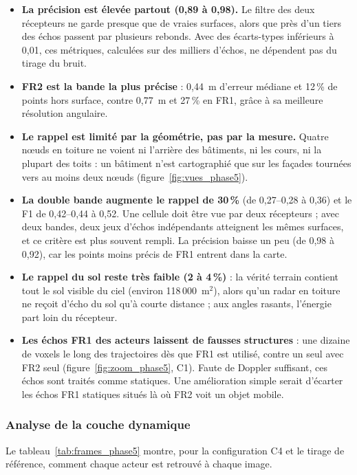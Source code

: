 \documentclass[12pt,a4paper,titlepage]{article}
\begin{document}
\begin{itemize}[leftmargin=1.5em]
    \item \textbf{La précision est élevée partout (0,89 à 0,98).} Le filtre des deux récepteurs ne garde presque que de vraies surfaces, alors que près d'un tiers des échos passent par plusieurs rebonds. Avec des écarts-types inférieurs à 0,01, ces métriques, calculées sur des milliers d'échos, ne dépendent pas du tirage du bruit.
    \item \textbf{FR2 est la bande la plus précise} : 0,44~m d'erreur médiane et 12\,\% de points hors surface, contre 0,77~m et 27\,\% en FR1, grâce à sa meilleure résolution angulaire.
    \item \textbf{Le rappel est limité par la géométrie, pas par la mesure.} Quatre n\oe uds en toiture ne voient ni l'arrière des bâtiments, ni les cours, ni la plupart des toits : un bâtiment n'est cartographié que sur les façades tournées vers au moins deux n\oe uds (figure~\ref{fig:vues_phase5}).
    \item \textbf{La double bande augmente le rappel de 30\,\%} (de 0,27--0,28 à 0,36) et le F1 de 0,42--0,44 à 0,52. Une cellule doit être vue par deux récepteurs ; avec deux bandes, deux jeux d'échos indépendants atteignent les mêmes surfaces, et ce critère est plus souvent rempli. La précision baisse un peu (de 0,98 à 0,92), car les points moins précis de FR1 entrent dans la carte.
    \item \textbf{Le rappel du sol reste très faible (2 à 4\,\%)} : la vérité terrain contient tout le sol visible du ciel (environ 118\,000~m$^2$), alors qu'un radar en toiture ne reçoit d'écho du sol qu'à courte distance ; aux angles rasants, l'énergie part loin du récepteur.
    \item \textbf{Les échos FR1 des acteurs laissent de fausses structures} : une dizaine de voxels le long des trajectoires dès que FR1 est utilisé, contre un seul avec FR2 seul (figure~\ref{fig:zoom_phase5}, C1). Faute de Doppler suffisant, ces échos sont traités comme statiques. Une amélioration simple serait d'écarter les échos FR1 statiques situés là où FR2 voit un objet mobile.
\end{itemize}

\subsubsection{Analyse de la couche dynamique}

Le tableau~\ref{tab:frames_phase5} montre, pour la configuration C4 et le tirage de référence, comment chaque acteur est retrouvé à chaque image.
\end{document}
